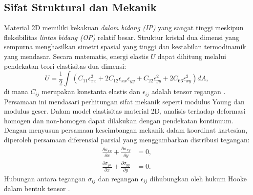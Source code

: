 \subsection{Sifat Struktural dan Mekanik}
Material 2D memiliki kekakuan \emph{dalam bidang (IP)} yang sangat tinggi meskipun fleksibilitas \emph{lintas bidang (OP)} relatif besar.
Struktur kristal dua dimensi yang sempurna menghasilkan simetri spasial yang tinggi dan kestabilan termodinamik yang mendasar.
Secara matematis, energi elastis \( U \) dapat dihitung melalui pendekatan teori elastisitas dua dimensi:
\begin{equation}
    U = \frac{1}{2} \int \left( C_{11}\epsilon_{xx}^2 + 2C_{12}\epsilon_{xx}\epsilon_{yy} + C_{22}\epsilon_{yy}^2 + 2C_{66}\epsilon_{xy}^2 \right) dA,
\end{equation}
di mana \( C_{ij} \) merupakan konstanta elastis dan \( \epsilon_{ij} \) adalah tensor regangan \citep{Lee2008}.
Persamaan ini mendasari perhitungan sifat mekanik seperti modulus Young dan modulus geser.
Dalam model elastisitas material 2D, analisis terhadap deformasi homogen dan non-homogen dapat dilakukan dengan pendekatan kontinuum.
Dengan menyusun persamaan keseimbangan mekanik dalam koordinat kartesian, diperoleh persamaan diferensial parsial yang menggambarkan distribusi tegangan:
\begin{align}
    \frac{\partial \sigma_{xx}}{\partial x} + \frac{\partial \sigma_{xy}}{\partial y} &= 0, \nonumber \\
    \frac{\partial \sigma_{yx}}{\partial x} + \frac{\partial \sigma_{yy}}{\partial y} &= 0.
\end{align}
Hubungan antara tegangan \( \sigma_{ij} \) dan regangan \( \epsilon_{ij} \) dihubungkan oleh hukum Hooke dalam bentuk tensor \citep{Timoshenko1970}.

